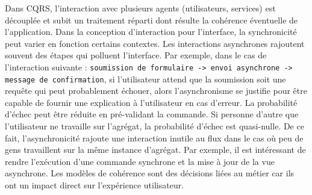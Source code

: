 Dans \gls{CQRS}, l'interaction avec plusieurs agents (utilisateurs, services) est 
découplée et subit un traitement réparti dont résulte la cohérence éventuelle de 
l'application. Dans la conception d'interaction pour l'interface, la synchronicité peut 
varier en fonction certains contextes. 
Les interactions asynchrones rajoutent souvent des étapes qui polluent l'interface.  
Par exemple, dans le cas de l'interaction suivante : \texttt{soumission de 
formulaire -> envoi asynchrone -> message de confirmation}, si l'utilisateur attend 
que la soumission soit une requête qui peut probablement échouer, alors 
l'asynchronisme se justifie pour être capable de fournir une explication à 
l'utilisateur en cas d'erreur. 
La probabilité d'échec peut être réduite en pré-validant la commande. Si personne 
d'autre que l'utilisateur ne travaille sur l'agrégat, la probabilité d'échec est 
quasi-nulle. De ce 
fait, l'asynchronicité rajoute une interaction inutile au flux dans le cas où peu de 
gens travaillent sur la même instance d'agrégat.
Par exemple, il est intéressant de rendre l'exécution d'une 
commande synchrone et la mise à jour de la vue asynchrone. 
Les modèles de cohérence sont des décisions liées au métier car ils ont un 
impact direct sur l'expérience utilisateur. 

%
%


